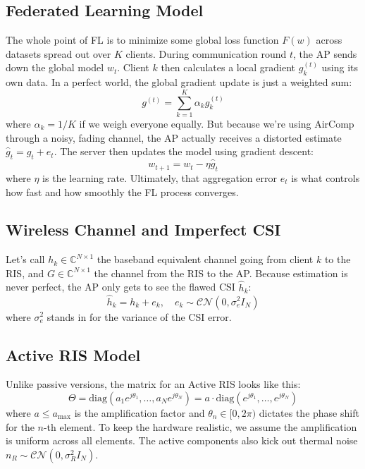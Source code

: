 \documentclass[lettersize,journal]{IEEEtran}
\begin{document}
\subsection{Federated Learning Model}
The whole point of FL is to minimize some global loss function $F(w)$ across datasets spread out over $K$ clients. During communication round $t$, the AP sends down the global model $w_t$. Client $k$ then calculates a local gradient $g_k^{(t)}$ using its own data. In a perfect world, the global gradient update is just a weighted sum:
\begin{equation}
g^{(t)} = \sum_{k=1}^K \alpha_k g_k^{(t)}
\end{equation}
where $\alpha_k = 1/K$ if we weigh everyone equally. But because we're using AirComp through a noisy, fading channel, the AP actually receives a distorted estimate $\hat{g}_t = g_t + e_t$. The server then updates the model using gradient descent:
\begin{equation}
w_{t+1} = w_t - \eta \hat{g}_t
\end{equation}
where $\eta$ is the learning rate. Ultimately, that aggregation error $e_t$ is what controls how fast and how smoothly the FL process converges.

\subsection{Wireless Channel and Imperfect CSI}
Let's call $h_k \in \mathbb{C}^{N \times 1}$ the baseband equivalent channel going from client $k$ to the RIS, and $G \in \mathbb{C}^{N \times 1}$ the channel from the RIS to the AP. Because estimation is never perfect, the AP only gets to see the flawed CSI $\hat{h}_k$:
\begin{equation}
\hat{h}_k = h_k + e_k, \quad e_k \sim \mathcal{CN}(0, \sigma_e^2 I_N)
\end{equation}
where $\sigma_e^2$ stands in for the variance of the CSI error.

\subsection{Active RIS Model}
Unlike passive versions, the matrix for an Active RIS looks like this:
\begin{equation}
\Theta = \text{diag}(a_1 e^{j\theta_1}, \dots, a_N e^{j\theta_N}) = a \cdot \text{diag}(e^{j\theta_1}, \dots, e^{j\theta_N})
\end{equation}
where $a \le a_{\max}$ is the amplification factor and $\theta_n \in [0, 2\pi)$ dictates the phase shift for the $n$-th element. To keep the hardware realistic, we assume the amplification is uniform across all elements. The active components also kick out thermal noise $n_R \sim \mathcal{CN}(0, \sigma_R^2 I_N)$.
\end{document}
